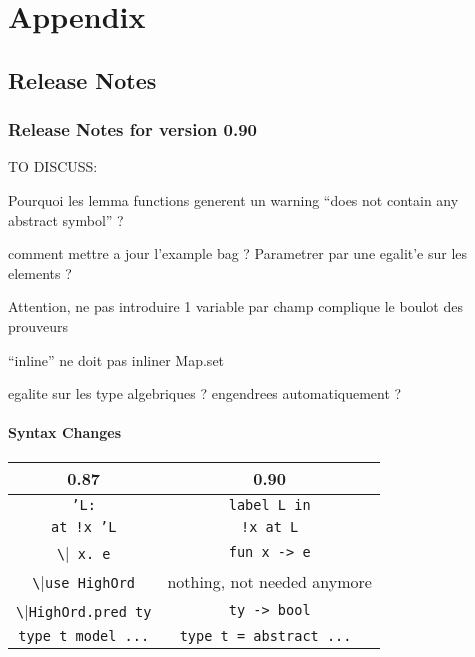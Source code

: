 \documentclass[a4paper,11pt,twoside,openright]{memoir}
\begin{document}








% 








\part{Appendix}

\appendix

\chapter{Release Notes}

\section{Release Notes for version 0.90}

TO DISCUSS:

Pourquoi les lemma functions generent un warning ``does not contain any
abstract symbol'' ?

comment mettre a jour l'example bag ? Parametrer par une egalit'e sur
les elements ?


Attention, ne pas introduire 1 variable par champ complique le boulot des prouveurs

``inline'' ne doit pas inliner Map.set

egalite sur les type algebriques ? engendrees automatiquement ?

\subsection{Syntax Changes}

\begin{center}
  \begin{tabular}{|c|c|}
\hline
    0.87 & 0.90 \\
\hline
\texttt{'L:} & \texttt{label L in} \\
\texttt{at !x 'L} & \texttt{!x at L} \\
\verb|\|\texttt{ x. e} & \texttt{fun x -> e} \\
\verb|\|\texttt{use HighOrd} & nothing, not needed anymore \\
\verb|\|\texttt{HighOrd.pred ty} & \texttt{ty -> bool} \\
\texttt{type t model ...} & \texttt{type t = abstract ... } \\
\hline
  \end{tabular}
\end{center}
\end{document}
